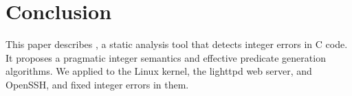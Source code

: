\section{Conclusion}
\label{s:concl}

This paper describes \sys, a static analysis tool that detects
integer errors in C code.  It proposes a pragmatic integer
semantics and effective predicate generation algorithms.
We applied \sys to the Linux kernel, the lighttpd web server, and
OpenSSH, and fixed \nrbugs integer errors in them.
